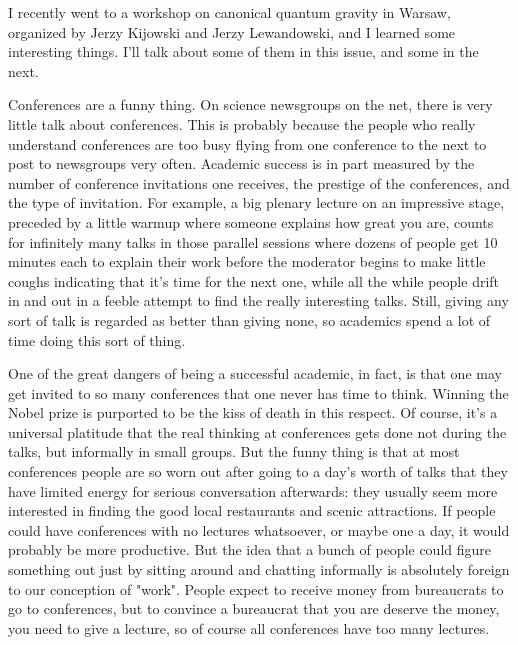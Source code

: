 

I recently went to a workshop on canonical quantum gravity 
in Warsaw, organized by Jerzy Kijowski and Jerzy Lewandowski,
and I learned some interesting things.  I'll talk about some of them
in this issue, and some in the next.

Conferences are a funny thing.  On science newsgroups on the net,
there is very little talk about conferences.  This is probably because 
the people who really understand conferences are too busy flying from one 
conference to the next to post to newsgroups very often.  Academic success is
in part measured by the number of conference invitations one receives,
the prestige of the conferences, and the type of invitation.  For example,
a big plenary lecture on an impressive stage, preceded by a little warmup
where someone explains how great you are, counts for infinitely many talks 
in those parallel sessions where dozens of people get 10 minutes each to 
explain their work before the moderator begins to make little coughs 
indicating that it's time for the next one, while all the while people drift 
in and out in a feeble attempt to find the really interesting talks.  
Still, giving any sort of talk is regarded as better than giving none, so
academics spend a lot of time doing this sort of thing.  

One of the great dangers of being a successful academic, in fact, is that 
one may get invited to so many conferences that one never has time to think.
Winning the Nobel prize is purported to be the kiss of death in this respect.
Of course, it's a universal platitude that the real thinking at conferences 
gets done not during the talks, but informally in small groups.  But the 
funny thing is that at most conferences people are so worn out after going 
to a day's worth of talks that they have limited energy for serious 
conversation afterwards: they usually seem more interested in
finding the good local restaurants and scenic attractions.  If people could
have conferences with no lectures whatsoever, or maybe one a day, it would
probably be more productive.  But the idea that a bunch of people 
could figure something out just by sitting around and chatting informally 
is absolutely foreign to our conception of "work".  People expect to receive
money from bureaucrats to go to conferences, but to convince a bureaucrat
that you are deserve the money, you need to give a lecture, so of course 
all conferences have too many lectures.

